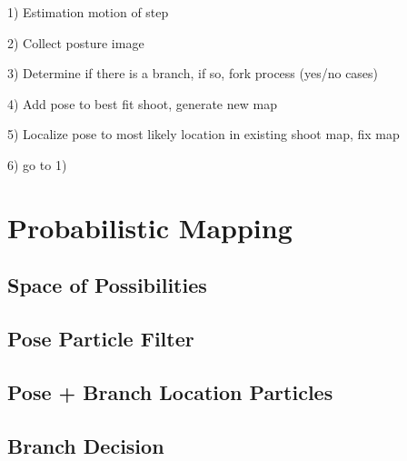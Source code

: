 1) Estimation motion of step

2) Collect posture image

3) Determine if there is a branch, if so, fork process (yes\slash no cases)

4) Add pose to best fit shoot, generate new map

5) Localize pose to most likely location in existing shoot map, fix map

6) go to 1)

\pagebreak 

\chapter{Probabilistic Mapping}
\label{probabilisticmapping}

\section{Space of Possibilities}
\label{spaceofpossibilities}

\section{Pose Particle Filter}
\label{poseparticlefilter}

\section{Pose + Branch Location Particles}
\label{posebranchlocationparticles}

\section{Branch Decision}
\label{branchdecision}




